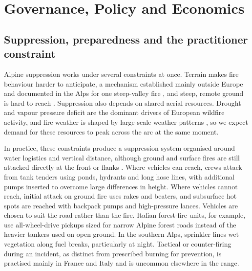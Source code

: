 \documentclass[11pt,a4paper]{article}
\begin{document}
\section{Governance, Policy and Economics}
\label{sec:governance}

\subsection{Suppression, preparedness and the practitioner constraint}

Alpine suppression works under several constraints at once. Terrain makes fire behaviour harder to anticipate, a mechanism established mainly outside Europe \citep{sharples_overview_2009} and documented in the Alps for one steep-valley fire \citep{melzner_brief_2019}, and steep, remote ground is hard to reach \citep{muller_forest_2020}. Suppression also depends on shared aerial resources. Drought and vapour pressure deficit are the dominant drivers of European wildfire activity, and fire weather is shaped by large-scale weather patterns \citep{miller_compounding_2025}, so we expect demand for these resources to peak across the arc at the same moment.

In practice, these constraints produce a suppression system organised around water logistics and vertical distance, although ground and surface fires are still attacked directly at the front or flanks \citep{muller_forest_2020}. Where vehicles can reach, crews attack from tank tenders using ponds, hydrants and long hose lines, with additional pumps inserted to overcome large differences in height. Where vehicles cannot reach, initial attack on ground fire uses rakes and beaters, and subsurface hot spots are reached with backpack pumps and high-pressure lances. Vehicles are chosen to suit the road rather than the fire. Italian forest-fire units, for example, use all-wheel-drive pickups sized for narrow Alpine forest roads instead of the heavier tankers used on open ground. In the southern Alps, sprinkler lines wet vegetation along fuel breaks, particularly at night. Tactical or counter-firing during an incident, as distinct from prescribed burning for prevention, is practised mainly in France and Italy and is uncommon elsewhere in the range.
\end{document}
